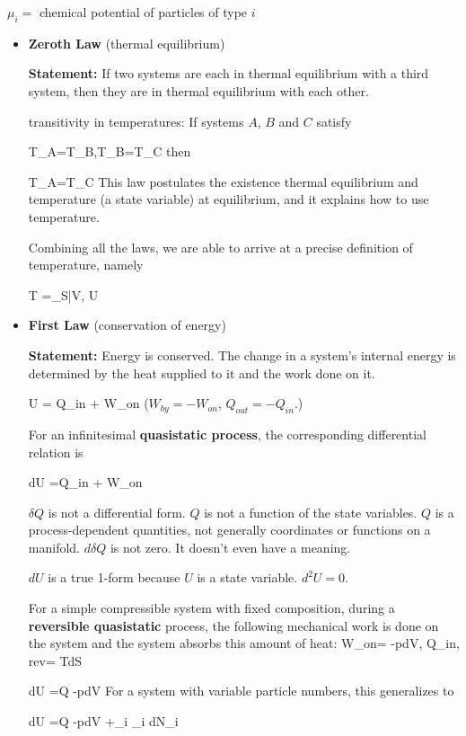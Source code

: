 $\mu_i=$ chemical
potential of particles of type $i$

\begin{itemize}
\item {\bf Zeroth Law} (thermal equilibrium)

{\bf Statement:} If two systems are each in thermal equilibrium with a third system, then they are in thermal equilibrium with each other.

transitivity in temperatures: If systems $A$, $B$ and $C$ satisfy 

\beq
T_A=T_B,\quad T_B=T_C
\eeq
then

\beq
T_A=T_C
\eeq
This law postulates the existence thermal equilibrium and temperature (a state variable)
at equilibrium, and it
explains how to use temperature.

Combining all the laws,
we are able to arrive at a precise definition of temperature, namely

\beq
T =\partial_{S|V, }U
\eeq

\item {\bf First Law} (conservation of energy)

{\bf Statement:} Energy is conserved. The change in a system's internal energy is determined by the heat supplied to it and the work done on it.

\beq
\Delta U = Q_{in}
+ W_{on}
\eeq
($W_{by}=-W_{on}$, $Q_{out}=-Q_{in}$.)

For an infinitesimal {\bf quasistatic process}, the corresponding differential relation is

\beq
dU =\delta Q_{in} + \delta W_{on}
\eeq

$\delta Q$ is not
a differential form. $Q$ is not a function of the 
state variables. $Q$ is a process-dependent quantities, not generally coordinates or functions on a manifold.
$d\delta Q$ is not zero. It doesn't even have a meaning.

$dU$ is a true 1-form because $U$ is a state variable. $d^2U=0$.

For a simple compressible system with fixed composition,
during a {\bf reversible quasistatic} process, the
following mechanical work is done on the system  and the system absorbs this amount of heat:
\beq
\delta W_{on}= -pdV,
\quad \delta Q_{in, rev}= TdS
\eeq

\beq
dU =\delta Q -pdV
\eeq
For a system with variable particle numbers, this generalizes to

\beq
dU =\delta Q -pdV
+\sum_i \mu_i dN_i
\quad {}
\eeq


\end{itemize}
